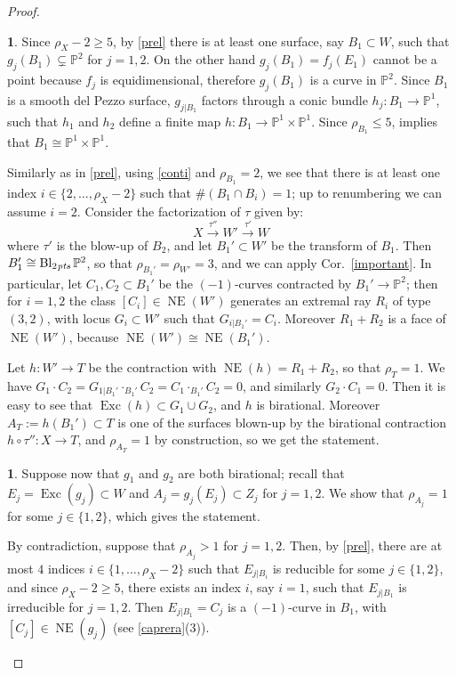 \documentclass[a4paper,12pt]{amsart}
\theoremstyle{definition}
\newtheorem{prg}[thm]{}
\numberwithin{figure}{section}
\numberwithin{table}{section}
\newcommand{\la}{\longrightarrow}
\newcommand{\pr}{\mathbb{P}}
\newcommand{\NE}{\operatorname{NE}}
\newcommand{\Exc}{\operatorname{Exc}}
\newcommand{\Bl}{\operatorname{Bl}}
\newcommand{\pts}{\text{\it pts}}
\begin{document}
\begin{proof}
\begin{prg}
Since $\rho_X-2\geq 5$, by \ref{prel} there is at least  one surface, say $B_1\subset W$, such that $g_j(B_1)\subsetneq\pr^2$ for $j=1,2$. 
    On the other hand $g_j(B_1)=f_j(E_1)$ cannot be a point because $f_j$ is equidimensional, therefore $g_j(B_1)$ is a curve in $\pr^2$. Since $B_1$ is a smooth del Pezzo surface, $g_{j|B_1}$ factors through a conic bundle $h_j\colon B_1\to\pr^1$, such that $h_1$ and $h_2$ define a finite map $h\colon B_1\to\pr^1\times\pr^1$. Since $\rho_{B_1}\leq 5$, \cite[Prop.~7.2]{druelNefEff} implies that $B_1\cong\pr^1\times\pr^1$.

 Similarly as in \ref{prel}, using \eqref{conti} and $\rho_{B_1}=2$,
    we see that there is at least one index $i\in\{2,\dotsc,\rho_X-2\}$  such that  $\#(B_1\cap B_i)=1$; up to renumbering we can assume $i=2$.
Consider the factorization of $\tau$ given by:
  $$X\stackrel{\tau''}{\la} W'\stackrel{\tau'}{\la} W$$
where 
$\tau'$ is the blow-up of $B_2$, and let $B_1'\subset W'$ be the transform of $B_1$. Then $B_1'\cong\Bl_{2\mskip1mu\pts}\pr^2$, so that $\rho_{B_1'}=\rho_{W'}=3$, and we can apply Cor.~\ref{important}.
In particular, let $C_1,C_2\subset B_1'$ be the $(-1)$-curves contracted by $B_1'\to\pr^2$; then for $i=1,2$ the class $[C_i]\in\NE(W')$ generates an extremal ray $R_i$ of type $(3,2)$, with locus $G_i\subset W'$ such that $G_{i|B_1'}=C_i$.
Moreover
 $R_1+R_2$ is a face of $\NE(W')$, because $\NE(W')\cong\NE(B_1')$. 

 Let $h\colon W'\to T$ be the contraction with $\NE(h)=R_1+R_2$, so that $\rho_T=1$.
   We have $G_1\cdot C_2=G_{1|B_1'}\cdot_{B_1'}C_2=C_1\cdot_{B_1'}C_2=0$, and similarly $G_2\cdot C_1=0$. Then it is easy to see that $\Exc(h)\subset G_1\cup G_2$, and $h$ is birational. Moreover $A_T:=h(B_1')\subset T$ is one of the surfaces blown-up by the birational contraction $h\circ\tau''\colon X\to T$, and $\rho_{A_T}=1$ by construction, so we get the statement.
\end{prg}  
\begin{prg}
  Suppose now that $g_1$ and $g_2$ are both birational; recall that $E_j=\Exc(g_j)\subset W$ and $A_j=g_j(E_j)\subset Z_j$ for $j=1,2$. We show that $\rho_{A_j}=1$ for some $j\in\{1,2\}$, which gives the statement.

By contradiction, suppose that $\rho_{A_j}>1$ for $j=1,2$.
Then, by \ref{prel}, there are at 
 most $4$ indices $i\in\{1,\dotsc,\rho_X-2\}$ such that $E_{j|B_i}$ is reducible for some $j\in\{1,2\}$, and since $\rho_X-2\geq 5$,
 there exists an index $i$, say $i=1$, such that  $E_{j|B_1}$ is irreducible
for $j=1,2$. Then
  $E_{j|B_1}=C_j$ is a $(-1)$-curve in $B_1$, with $[C_j]\in\NE(g_j)$ (see \ref{caprera}(3)).


\end{prg}
\end{proof}
\end{document}
